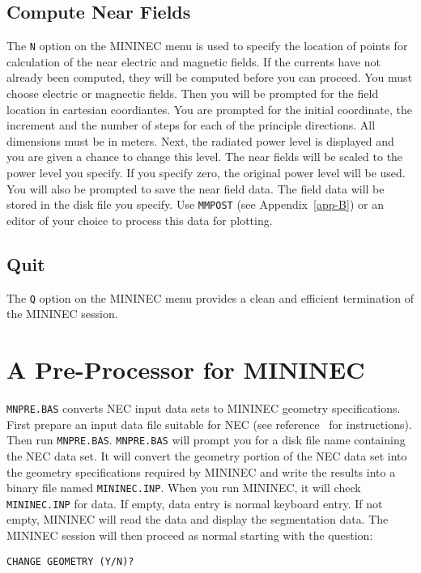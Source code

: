 \documentclass[12pt]{article}
\begin{document}
\subsection{Compute Near Fields}
The \verb+N+ option on the MININEC menu is used to specify the location
of points for calculation of the near electric and magnetic fields. If
the currents have not already been computed, they will be computed
before you can proceed. You must choose electric or magnectic fields.
Then you will be prompted for the field location in cartesian
coordiantes. You are prompted for the initial coordinate, the increment
and the number of steps for each of the principle directions. All
dimensions must be in meters. Next, the radiated power level is
displayed and you are given a chance to change this level. The near
fields will be scaled to the power level you specify. If you specify
zero, the original power level will be used. You will also be prompted
to save the near field data. The field data will be stored in the disk
file you specify. Use \verb+MMPOST+ (see Appendix~\ref{app-B}) or an
editor of your choice to process this data for plotting.

\subsection{Quit}
The \verb+Q+ option on the MININEC menu provides a clean and efficient
termination of the MININEC session.

\clearpage

\clearpage

\appendix
\section{A Pre-Processor for MININEC}
\label{sec-appendix-a}
\verb+MNPRE.BAS+ converts NEC input data sets to MININEC geometry
specifications. First prepare an input data file suitable for NEC (see
reference~\cite{r5} for instructions). Then run \verb+MNPRE.BAS+.
\verb+MNPRE.BAS+ will prompt you for a disk file name containing the NEC
data set. It will convert the geometry portion of the NEC data set into
the geometry specifications required by MININEC and write the results
into a binary file named \verb+MININEC.INP+. When you run MININEC, it
will check \verb+MININEC.INP+ for data. If empty, data entry is normal
keyboard entry. If not empty, MININEC will read the data and display the
segmentation data. The MININEC session will then proceed as normal
starting with the question:

\begin{Verbatim}
CHANGE GEOMETRY (Y/N)?
\end{Verbatim}
\end{document}

